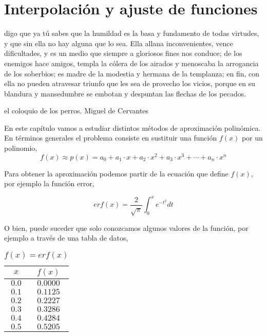 \chapter{Interpolación y ajuste de funciones}\label{interpolacion}

\epigraph{digo que ya tú sabes que la humildad es la basa y fundamento de todas virtudes, y que sin ella no hay alguna que lo sea. Ella allana inconvenientes, vence dificultades, y es un medio que siempre a gloriosos fines nos conduce; de los enemigos hace amigos, templa la cólera de los airados y menoscaba la arrogancia de los soberbios; es madre de la modestia y hermana de la templanza; en fin, con ella no pueden atravesar triunfo que les sea de provecho los vicios, porque en su blandura y mansedumbre se embotan y despuntan las flechas de los pecados.}{el coloquio de los perros. Miguel de Cervantes}



En este capítulo vamos a estudiar distintos métodos de aproximación polinómica. En términos generales el problema consiste en sustituir una función $f(x)$ por un polinomio,
\begin{equation*}
f(x)\approx p(x)=a_0+a_1\cdot x+a_2\cdot x^2+a_3\cdot x^3+\cdots +a_n \cdot x^n
\end{equation*}

Para obtener la aproximación podemos partir de la ecuación que define $f(x)$,  por ejemplo la función error,

\begin{equation*}
erf(x)=\frac{2}{\sqrt{\pi}}\int_0^x e^{-t^2}dt
\end{equation*}

O bien, puede suceder que solo conozcamos algunos valores de la función, por ejemplo a través de una tabla de datos,

\begin{table}[h]
\caption{$f(x)=erf(x)$}
\centering
\begin{tabular}{c|c}
$x$&$f(x)$\\ 
\hline
$0.0$& $0.0000$\\
$0.1$&$0.1125$\\
$0.2$&$0.2227$\\
$0.3$&$0.3286$\\
$0.4$&$0.4284$\\
$0.5$&$0.5205$\\
\end{tabular}
\label{tpuntos2}
\end{table}
 
